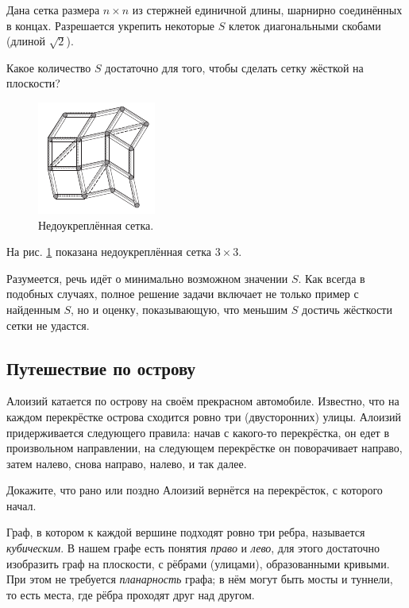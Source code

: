 Дана сетка размера $n \times n$ из стержней единичной длины, шарнирно соединённых в концах.
Разрешается укрепить некоторые $S$ клеток диагональными скобами (длиной $\sqrt{2}$).

Какое количество $S$ достаточно для того, чтобы сделать сетку жёсткой на плоскости?

\begin{figure}[ht!]
\centering
\includegraphics[scale=1]{pics/lattice1}
\caption{Недоукреплённая сетка.}
\label{pic:lattice1}
\end{figure}

На рис. \ref{pic:lattice1} показана недоукреплённая сетка $3 \times 3$.

\begin{addedbytheeditors}
Разумеется, речь идёт о минимально возможном значении $S$. Как всегда в подобных случаях, полное решение задачи включает не только пример с найденным $S$, но и оценку, показывающую, что меньшим $S$ достичь жёсткости сетки не удастся.  
\end{addedbytheeditors}

\subsection*{Путешествие по острову}

Алоизий катается по острову на своём прекрасном автомобиле.
Известно, что на каждом перекрёстке острова сходится ровно три (двусторонних) улицы.
Алоизий придерживается следующего правила:
начав с какого-то перекрёстка, он едет в произвольном направлении, на следующем перекрёстке он поворачивает направо, затем налево,
снова направо, налево, и так далее.

Докажите, что рано или поздно Алоизий вернётся на перекрёсток, с которого начал.

Граф, в котором к каждой вершине подходят ровно три ребра, называется \emph{кубическим}.
В нашем графе есть понятия \emph{право} и \emph{лево},
для этого достаточно изобразить граф на плоскости, с рёбрами (улицами), образованными кривыми.
При этом не требуется \emph{планарность} графа;
в нём могут быть мосты и туннели, то есть места, где рёбра проходят друг над другом.


